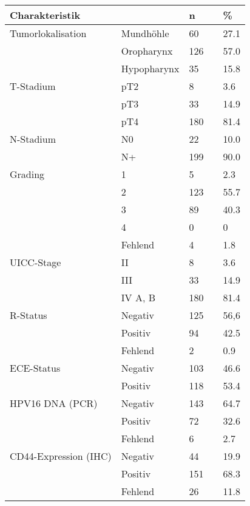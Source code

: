 \begin{tablenos:no-prefix-table-caption}

\begin{longtable}[]{@{}lllll@{}}
\toprule()
Charakteristik & & n & & \% \\
\midrule()
\endhead
Tumorlokalisation & Mundhöhle & 60 & & 27.1 \\
& Oropharynx & 126 & & 57.0 \\
& Hypopharynx & 35 & & 15.8 \\
T-Stadium & pT2 & 8 & & 3.6 \\
& pT3 & 33 & & 14.9 \\
& pT4 & 180 & & 81.4 \\
N-Stadium & N0 & 22 & & 10.0 \\
& N+ & 199 & & 90.0 \\
Grading & 1 & 5 & & 2.3 \\
& 2 & 123 & & 55.7 \\
& 3 & 89 & & 40.3 \\
& 4 & 0 & & 0 \\
& Fehlend & 4 & & 1.8 \\
UICC-Stage & II & 8 & & 3.6 \\
& III & 33 & & 14.9 \\
& IV A, B & 180 & & 81.4 \\
R-Status & Negativ & 125 & & 56,6 \\
& Positiv & 94 & & 42.5 \\
& Fehlend & 2 & & 0.9 \\
ECE-Status & Negativ & 103 & & 46.6 \\
& Positiv & 118 & & 53.4 \\
HPV16 DNA (PCR) & Negativ & 143 & & 64.7 \\
& Positiv & 72 & & 32.6 \\
& Fehlend & 6 & & 2.7 \\
CD44-Expression (IHC) & Negativ & 44 & & 19.9 \\
& Positiv & 151 & & 68.3 \\
& Fehlend & 26 & & 11.8 \\
\bottomrule()
\end{longtable}

\end{tablenos:no-prefix-table-caption}

